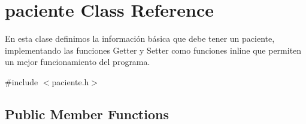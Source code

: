 \hypertarget{classpaciente}{}\section{paciente Class Reference}
\label{classpaciente}


En esta clase definimos la información básica que debe tener un paciente, implementando las funciones Getter y Setter como funciones inline que permiten un mejor funcionamiento del programa.  




{\ttfamily \#include $<$paciente.\+h$>$}

\subsection*{Public Member Functions}
